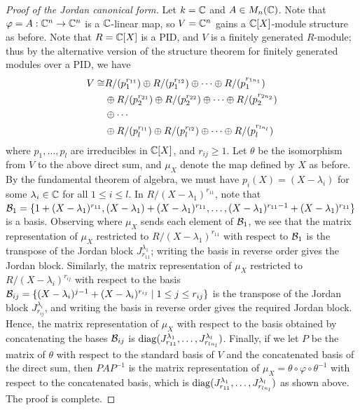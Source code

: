 \begin{proof}[Proof of the Jordan canonical form]
    Let $k = \mathbb{C}$ and $A \in M_{n}(\mathbb{C})$. Note that $\varphi = A:\mathbb{C}^{n} \to \mathbb{C}^{n}$ is a $\mathbb{C}$-linear map, so $V = \mathbb{C}^{n}$ gains a $\mathbb{C}[X]$-module structure as before. Note that $R = \mathbb{C}[X]$ is a PID, and $V$ is a finitely generated $R$-module; thus by the alternative version of the structure theorem for finitely generated modules over a PID, we have
    \begin{align}
        V \cong &R/(p_{1}^{r_{11}}) \oplus R/(p_{1}^{r_{12}}) \oplus \cdots \oplus R/(p_{1}^{r_{1n_{1}}}) \notag \\
        &\oplus R/(p_{2}^{r_{21}}) \oplus R/(p_{2}^{r_{22}}) \oplus \cdots \oplus R/(p_{2}^{r_{2n_{2}}}) \notag \\
        &\oplus \cdots \notag \\
        &\oplus R/(p_{l}^{r_{l1}}) \oplus R/(p_{l}^{r_{l2}}) \oplus \cdots \oplus R/(p_{l}^{r_{ln_{l}}})
    \end{align}
    where $p_{1},\ldots,p_{l}$ are irreducibles in $\mathbb{C}[X]$, and $r_{ij} \geq 1$. Let $\theta$ be the isomorphism from $V$ to the above direct sum, and $\mu_{X}$ denote the map defined by $X$ as before. By the fundamental theorem of algebra, we must have $p_{i}(X) = (X-\lambda_{i})$ for some $\lambda_{i} \in \mathbb{C}$ for all $1 \leq i \leq l$. In $R/(X-\lambda_{1})^{r_{11}}$, note that $\mathcal{B}_{1} = \{1+(X-\lambda_{1})^{r_{11}}, (X-\lambda_{1})+(X-\lambda_{1})^{r_{11}}, \ldots, (X-\lambda_{1})^{r_{11}-1}+(X-\lambda_{1})^{r_{11}}\}$ is a basis. Observing where $\mu_{X}$ sends each element of $\mathcal{B}_{1}$, we see that the matrix representation of $\mu_{X}$ restricted to $R/(X-\lambda_{1})^{r_{11}}$ with respect to $\mathcal{B}_{1}$ is the transpose of the Jordan block $J_{r_{11}}^{\lambda_{1}}$; writing the basis in reverse order gives the Jordan block. Similarly, the matrix representation of $\mu_{X}$ restricted to $R/(X-\lambda_{i})^{r_{ij}}$ with respect to the basis $\mathcal{B}_{ij} = \{(X-\lambda_{i})^{j-1}+(X-\lambda_{i})^{r_{ij}} \mid 1 \leq j \leq r_{ij}\}$ is the transpose of the Jordan block $J_{r_{ij}}^{\lambda_{i}}$, and writing the basis in reverse order gives the required Jordan block. Hence, the matrix representation of $\mu_{X}$ with respect to the basis obtained by concatenating the bases $\mathcal{B}_{ij}$ is $\operatorname{diag} (J_{r_{11}}^{\lambda_{1}},\ldots,J_{r_{ln_{l}}}^{\lambda_{l}})$. Finally, if we let $P$ be the matrix of $\theta$ with respect to the standard basis of $V$ and the concatenated basis of the direct sum, then $PAP^{-1}$ is the matrix representation of $\mu_{X} = \theta \circ \varphi \circ \theta^{-1}$ with respect to the concatenated basis, which is $\operatorname{diag} (J_{r_{11}}^{\lambda_{1}},\ldots,J_{r_{ln_{l}}}^{\lambda_{l}})$ as shown above. The proof is complete.
\end{proof}


